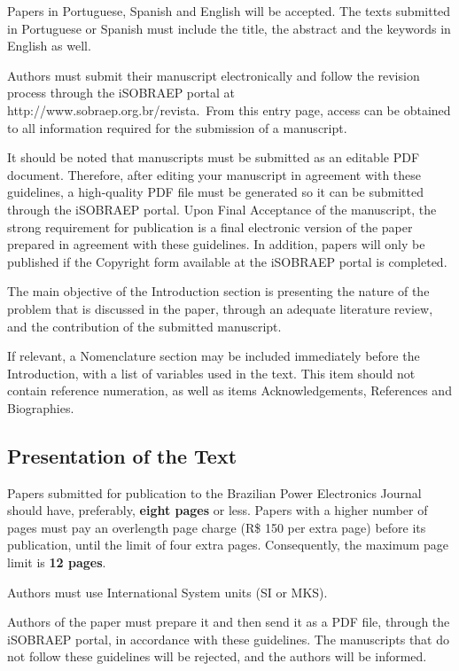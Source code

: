 \documentclass[english]{sobraep}
\begin{document}
Papers in Portuguese, Spanish and English will be accepted. The texts submitted in Portuguese or Spanish must include the title, the abstract and the keywords in English as well.

Authors must submit their manuscript electronically and follow the revision process through the iSOBRAEP portal at http://www.sobraep.org.br/revista.~From this entry page, access can be obtained to all information required for the submission of a manuscript.

\newpage
It should be noted that manuscripts must be submitted as an editable PDF document. Therefore, after editing your manuscript in agreement with these guidelines, a high-quality PDF file must be generated so it can be submitted through the iSOBRAEP portal. Upon Final Acceptance of the manuscript, the strong requirement for publication is a final electronic version of the paper prepared in agreement with these guidelines. In addition, papers will only be published if the Copyright form available at the iSOBRAEP portal is completed.

The main objective of the Introduction section is presenting the nature of the problem that is discussed in the paper, through an adequate literature review, and the contribution of the submitted manuscript.

If relevant, a Nomenclature section may be included immediately before the Introduction, with a list of variables used in the text. This item should not contain reference numeration, as well as items Acknowledgements, References and Biographies.

\subsection{Presentation of the Text}
Papers submitted for publication to the Brazilian Power Electronics Journal should have, preferably, \textbf{eight pages} or less. Papers with a higher number of pages must pay an overlength page charge (R\$ 150 per extra page) before its publication, until the limit of four extra pages. Consequently, the maximum page limit is \textbf{12 pages}.

Authors must use International System units (SI or MKS).

Authors of the paper must prepare it and then send it as a PDF file, through the iSOBRAEP portal, in accordance with these guidelines. The manuscripts that do not follow these guidelines will be rejected, and the authors will be informed.
\end{document}
